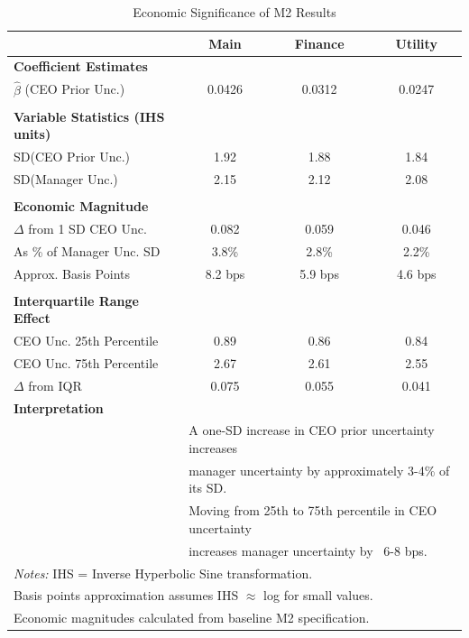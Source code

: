 \documentclass[11pt]{article}
\begin{document}
\newpage

\begin{table}[htbp]
\centering
\caption{Economic Significance of M2 Results}
\label{tab:economic_sig}
\footnotesize
\setlength{\tabcolsep}{8pt}
\begin{tabular}{lccc}
\toprule
 & Main & Finance & Utility \\
\midrule
\textbf{Coefficient Estimates} \\
$\hat{\beta}$ (CEO Prior Unc.) & 0.0426 & 0.0312 & 0.0247 \\
 &  &  & \\
\textbf{Variable Statistics (IHS units)} \\
SD(CEO Prior Unc.) & 1.92 & 1.88 & 1.84 \\
SD(Manager Unc.) & 2.15 & 2.12 & 2.08 \\
 &  &  & \\
\textbf{Economic Magnitude} \\
$\Delta$ from 1 SD CEO Unc. & 0.082 & 0.059 & 0.046 \\
As \% of Manager Unc. SD & 3.8\% & 2.8\% & 2.2\% \\
Approx. Basis Points & 8.2 bps & 5.9 bps & 4.6 bps \\
 &  &  & \\
\textbf{Interquartile Range Effect} \\
CEO Unc. 25th Percentile & 0.89 & 0.86 & 0.84 \\
CEO Unc. 75th Percentile & 2.67 & 2.61 & 2.55 \\
$\Delta$ from IQR & 0.075 & 0.055 & 0.041 \\
\midrule
\textbf{Interpretation} \\
 & \multicolumn{3}{l}{A one-SD increase in CEO prior uncertainty increases} \\
 & \multicolumn{3}{l}{manager uncertainty by approximately 3-4\% of its SD.} \\
 & \multicolumn{3}{l}{Moving from 25th to 75th percentile in CEO uncertainty} \\
 & \multicolumn{3}{l}{increases manager uncertainty by ~6-8 bps.} \\
\bottomrule
\multicolumn{4}{l}{\parbox{\linewidth}{\footnotesize \textit{Notes:} IHS = Inverse Hyperbolic Sine transformation.}} \\
\multicolumn{4}{l}{\parbox{\linewidth}{\footnotesize Basis points approximation assumes IHS $\approx$ log for small values.}} \\
\multicolumn{4}{l}{\parbox{\linewidth}{\footnotesize Economic magnitudes calculated from baseline M2 specification.}} \\
\end{tabular}
\end{table}
\end{document}
